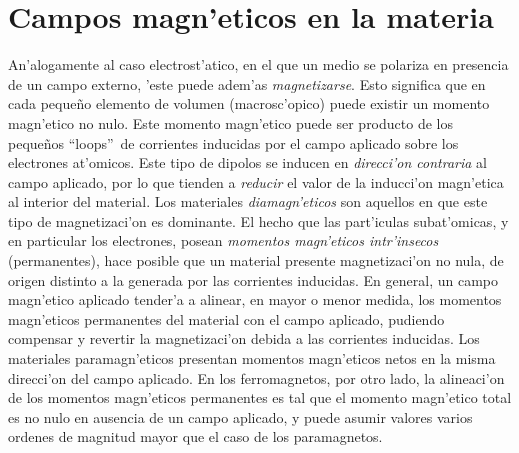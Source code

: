 \section{Campos magn'eticos en la materia}
An'alogamente al caso electrost'atico, en el que un medio se polariza en
presencia de un campo externo, 'este puede adem'as \textit{magnetizarse}. Esto
significa que en cada peque\~no elemento de volumen (macrosc'opico) puede existir un momento magn'etico no nulo. Este momento magn'etico puede ser producto de
los peque\~nos ``loops''\, de corrientes inducidas por el campo aplicado sobre los
electrones at'omicos. Este tipo de dipolos se inducen en \textit{direcci'on contraria}
al campo aplicado, por lo que tienden a \textit{reducir} el valor de la inducci'on
magn'etica al interior del material. Los materiales \textit{diamagn'eticos} son aquellos en que este tipo de magnetizaci'on es dominante. El hecho que las
part'iculas subat'omicas, y en particular los electrones, posean \textit{momentos
magn'eticos intr'insecos} (permanentes), hace posible que un material presente
magnetizaci'on no nula, de origen distinto a la generada por las corrientes
inducidas. En general, un campo magn'etico aplicado tender'a a alinear, en
mayor o menor medida, los momentos magn'eticos permanentes del material con el campo aplicado, pudiendo compensar y revertir la magnetizaci'on debida a las corrientes
inducidas. Los materiales paramagn'eticos presentan momentos magn'eticos
netos en la misma direcci'on del campo aplicado. En los ferromagnetos, por
otro lado, la alineaci'on de los momentos magn'eticos permanentes es tal que el
momento magn'etico total es no nulo en ausencia de un campo aplicado, y puede asumir valores varios ordenes de magnitud mayor que el caso de los paramagnetos.


